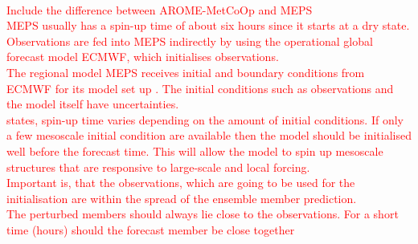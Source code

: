 \textcolor{red}{\citep[][p.6]{homleid_verification_2016}\\
	Include the difference between AROME-MetCoOp and MEPS \\ MEPS usually has a spin-up time of about six hours \citep{Priv_Comm_Koltzow} since it starts at a dry state. \\ Observations are fed into MEPS indirectly by using the operational global forecast model ECMWF, which initialises observations. \\ The regional model MEPS receives initial and boundary conditions from ECMWF for its model set up \citep{muller_arome-metcoop:_2017}.
	The initial conditions such as observations and the model itself have uncertainties. \\ \citet{warner_tutorial_1997} states, spin-up time varies depending on the amount of initial conditions. If only a few mesoscale initial condition are available then the model should be initialised well before the forecast time. This will allow the model to spin up mesoscale structures that are responsive to large-scale and local forcing.  \\ Important is, that the observations, which are going to be used for the initialisation are within the spread of the ensemble member prediction. \\ The perturbed members should always lie close to the observations. For a short time (hours) should the forecast member be close together \citep{kalnay_atmospheric_2003}
} %

